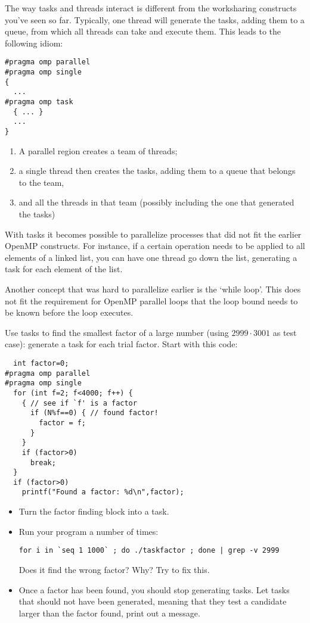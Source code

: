 The way tasks and threads interact is different from the worksharing
constructs you've seen so far. Typically, one thread will generate the
tasks, adding them to a queue, from which all threads can take and
execute them. This leads to the following idiom:
\begin{lstlisting}
#pragma omp parallel
#pragma omp single
{
  ...
#pragma omp task
  { ... }
  ...
}
\end{lstlisting}
\begin{enumerate}
\item A parallel region creates a team of threads;
\item a single thread then creates the tasks, adding them to a queue
  that belongs to the team,
\item and all the threads in that team (possibly including the one
  that generated the tasks) 
\end{enumerate}

With tasks it becomes possible to parallelize processes that did not
fit the earlier OpenMP constructs. For instance, if a certain
operation needs to be applied to all elements of a linked list, you
can have one thread go down the list, generating a task for each
element of the list.

Another concept that was hard to parallelize earlier is the `while
loop'. This does not fit the requirement for OpenMP parallel loops
that the loop bound needs to be known before the loop executes.

\begin{exercise}
  \label{ex:taskfactor}
  Use tasks to find the smallest factor of a large
  number (using $2999\cdot 3001$ as test case): generate a task for each
  trial factor. Start with this code:
\begin{lstlisting}
  int factor=0;
#pragma omp parallel
#pragma omp single
  for (int f=2; f<4000; f++) {
    { // see if `f' is a factor
      if (N%f==0) { // found factor!
        factor = f;
      }
    }
    if (factor>0)
      break;
  }
  if (factor>0)
    printf("Found a factor: %d\n",factor);
\end{lstlisting}
  \begin{itemize}
  \item Turn the factor finding block into a task.
  \item Run your program a number of times:
\begin{verbatim}
for i in `seq 1 1000` ; do ./taskfactor ; done | grep -v 2999
\end{verbatim}
    Does it find the wrong factor? Why? Try to fix this.
\item Once a factor has been found, you should stop generating
    tasks.
    Let tasks that should not have been generated, meaning that they
    test a candidate larger than the factor found, print out a message.
  \end{itemize}
\end{exercise}


